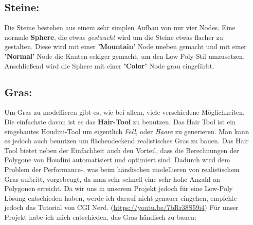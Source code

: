 \documentclass[paper=a4,fontsize=12pt,ngerman]{scrartcl}
\begin{document}
	\subsection*{Steine:}
	Die Steine bestehen aus einem sehr simplen Aufbau von nur vier Nodes. Eine normale \textbf{Sphere}, die etwas \textit{gestaucht} wird um die Steine etwas flacher zu gestalten. Diese wird mit einer \textbf{'Mountain'} Node uneben gemacht und mit einer \textbf{'Normal'} Node die Kanten eckiger gemacht, um den Low Poly Stil umzusetzen. Anschließend wird die Sphere mit einer \textbf{'Color'} Node grau eingefärbt.
	
	\subsection*{Gras:}
	Um Gras zu modellieren gibt es, wie bei allem, viele verschiedene Möglichkeiten. Die einfachste davon ist es das \textbf{Hair-Tool} zu benutzen. Das Hair Tool ist ein eingebautes Houdini-Tool um eigentlich \textit{Fell}, oder \textit{Haare} zu generieren. Man kann es jedoch auch benutzen um flächendeckend realistisches Gras zu bauen. Das Hair Tool bietet neben der Einfachheit auch den Vorteil, dass die Berechnungen der Polygone von Houdini automatisiert und optimiert sind. Dadurch wird dem Problem der Performance-, was beim händischen modellieren von realistischem Gras auftritt, vorgebeugt, da man sehr schnell eine sehr hohe Anzahl an Polygonen erreicht. Da wir uns in unserem Projekt jedoch für eine Low-Poly Lösung entschieden haben, werde ich darauf nicht genauer eingehen, empfehle jedoch das Tutorial von CGI Nerd. (\url{https://youtu.be/7bRr38S59i4})
	Für unser Projekt habe ich mich entschieden, das Gras händisch zu bauen:
\end{document}
